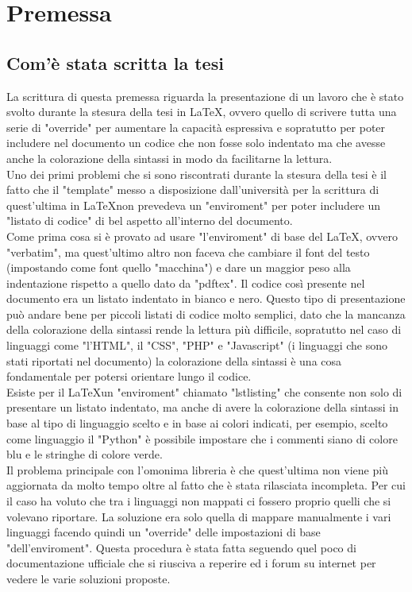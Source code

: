 \chapter{Premessa}\label{cap:premessa}

\section{Com'è stata scritta la tesi}\label{sez:Scrittura tesi}

La scrittura di questa premessa riguarda la presentazione di un lavoro che è stato svolto durante la stesura della tesi in \LaTeX, ovvero quello di scrivere tutta una serie di "override" per aumentare la capacità espressiva e sopratutto per poter includere nel documento un codice che non fosse solo indentato ma che avesse anche la colorazione della sintassi in modo da facilitarne la lettura.\\
\bigskip
Uno dei primi problemi che si sono riscontrati durante la stesura della tesi è il fatto che il "template" messo a disposizione dall'università per la scrittura di quest'ultima in \LaTeX non prevedeva un "enviroment" per poter includere un "listato di codice" di bel aspetto all'interno del documento.\\
Come prima cosa si è provato ad usare "l'enviroment" di base del \LaTeX, ovvero "verbatim", ma quest'ultimo altro non faceva che cambiare il font del testo (impostando come font quello "macchina") e dare un maggior peso alla indentazione rispetto a quello dato da "pdftex". Il codice così presente nel documento era un listato indentato in bianco e nero. Questo tipo di presentazione può andare bene per piccoli listati di codice molto semplici, dato che la mancanza della colorazione della sintassi rende la lettura più difficile, sopratutto nel caso di linguaggi come "l'HTML", il "CSS", "PHP" e "Javascript" (i linguaggi che sono stati riportati nel documento) la colorazione della sintassi è una cosa fondamentale per potersi orientare lungo il codice.\\
Esiste per il \LaTeX un "enviroment" chiamato "lstlisting" che consente non solo di presentare un listato indentato, ma anche di avere la colorazione della sintassi in base al tipo di linguaggio scelto e in base ai colori indicati, per esempio, scelto come linguaggio il "Python" è possibile impostare che i commenti siano di colore blu e le stringhe di colore verde.\\
Il problema principale con l'omonima libreria è che quest'ultima non viene più aggiornata da molto tempo oltre al fatto che è stata rilasciata incompleta. Per cui il caso ha voluto che tra i linguaggi non mappati ci fossero proprio quelli che si volevano riportare. La soluzione era solo quella di mappare manualmente i vari linguaggi facendo quindi un "override" delle impostazioni di base "dell'enviroment". Questa procedura è stata fatta seguendo quel poco di documentazione ufficiale che si riusciva a reperire ed i forum su internet per vedere le varie soluzioni proposte.\\
